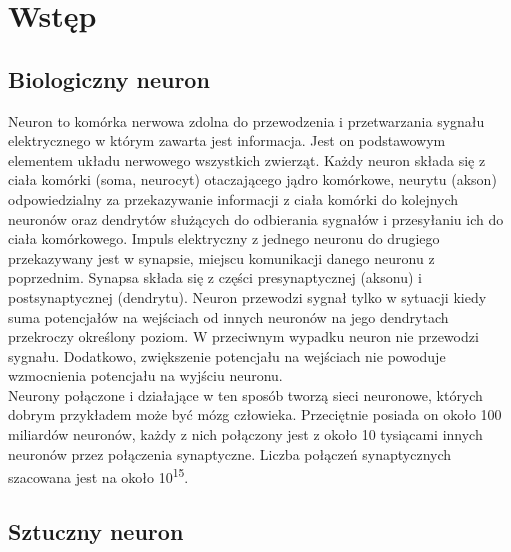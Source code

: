 
\chapter {Wstęp}

\section {Biologiczny neuron}

Neuron to komórka nerwowa zdolna do przewodzenia i przetwarzania sygnału
elektrycznego w którym zawarta jest informacja. Jest on podstawowym elementem
układu nerwowego wszystkich zwierząt. Każdy neuron składa się z
ciała komórki (soma, neurocyt) otaczającego jądro komórkowe, neurytu (akson)
odpowiedzialny za przekazywanie informacji z ciała komórki do kolejnych neuronów
oraz dendrytów służących do odbierania sygnałów i przesyłaniu ich do ciała
komórkowego. Impuls elektryczny z jednego neuronu do drugiego przekazywany jest
w synapsie, miejscu komunikacji danego neuronu z poprzednim. Synapsa składa się
z części presynaptycznej (aksonu) i postsynaptycznej (dendrytu). Neuron
przewodzi sygnał tylko w sytuacji kiedy suma potencjałów na wejściach od innych
neuronów na jego dendrytach przekroczy określony poziom. W przeciwnym wypadku
neuron nie przewodzi sygnału. Dodatkowo, zwiększenie potencjału na wejściach
nie powoduje wzmocnienia potencjału na wyjściu neuronu. \\
Neurony połączone i działające w ten sposób tworzą sieci neuronowe, których
dobrym przykładem może być mózg człowieka. Przeciętnie posiada on około 100
miliardów neuronów, każdy z nich połączony jest z około 10 tysiącami innych
neuronów przez połączenia synaptyczne. Liczba połączeń synaptycznych szacowana
jest na około 10\textsuperscript{15}.

\section {Sztuczny neuron}

